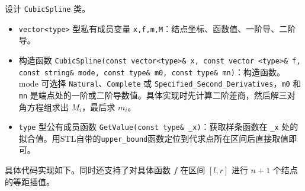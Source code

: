 \documentclass{ctexart}
\begin{document}
设计 \verb|CubicSpline| 类。

\begin{itemize}
\item \verb|vector<type>| 型私有成员变量 \verb|x,f,m,M|：结点坐标、函数值、一阶导、二阶导。
\item 构造函数 \verb|CubicSpline(const vector<type>& x, const vector <type>& f, const string& mode, const type& m0, const type& mn)|：构造函数。mode 可选择 \verb|Natural|、\verb|Complete| 或 \verb|Specified_Second_Derivatives|，\verb|m0| 和 \verb|mn| 是端点处的一阶或二阶导数值。具体实现时先计算二阶差商，然后解三对角方程组求出 $M_i$，最后求 $m_i$。
\item \verb|type| 型公有成员函数 \verb|GetValue(const type& _x)|：获取样条函数在 \verb|_x| 处的拟合值。用STL自带的\verb|upper_bound|函数定位到代求点所在区间后直接取值即可。
\end{itemize}

具体代码实现如下。同时还支持了对具体函数 $f$ 在区间 $[l,r]$ 进行 $n+1$ 个结点的等距插值。
\end{document}

